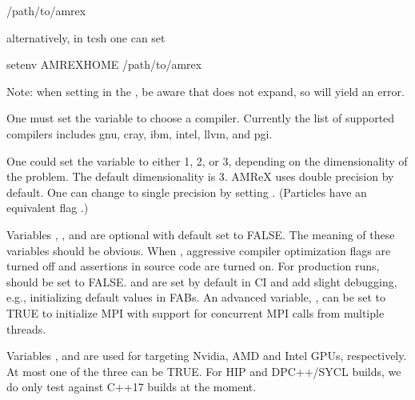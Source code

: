 \documentclass[letterpaper,10pt,english]{sphinxmanual}
\begin{document}
\begin{sphinxVerbatim}[commandchars=\\\{\}]
 /path/to/amrex
\end{sphinxVerbatim}

\sphinxAtStartPar
alternatively, in tcsh one can set

\begin{sphinxVerbatim}[commandchars=\\\{\}]
setenv AMREX\PYGZus{}HOME /path/to/amrex
\end{sphinxVerbatim}

\sphinxAtStartPar
Note: when setting  in the , be aware that \sphinxcode{\sphinxupquote{\textasciitilde{}}} does
not expand, so  will yield an error.

\sphinxAtStartPar
One must set the  variable to choose a compiler. Currently the list of
supported compilers includes gnu, cray, ibm, intel, llvm, and pgi.

\sphinxAtStartPar
One could set the  variable to either 1, 2, or 3, depending on
the dimensionality of the problem.  The default dimensionality is 3.
AMReX uses double precision by default.  One can change to single
precision by setting .
(Particles have an equivalent flag .)

\sphinxAtStartPar
Variables , ,  and  are optional with
default set to FALSE.  The meaning of these variables should
be obvious.  When , aggressive compiler optimization flags are
turned off and assertions in source code are turned on. For production runs,
 should be set to FALSE.  and  are set by
default in CI and add slight debugging, e.g., initializing default values in FABs.
An advanced variable, , can be set to TRUE to initialize
MPI with support for concurrent MPI calls from multiple threads.

\sphinxAtStartPar
Variables ,  and  are used for
targeting Nvidia, AMD and Intel GPUs, respectively.  At most one of
the three can be TRUE.
For HIP and DPC++/SYCL builds, we do only test against C++17 builds at the moment.
\end{document}
